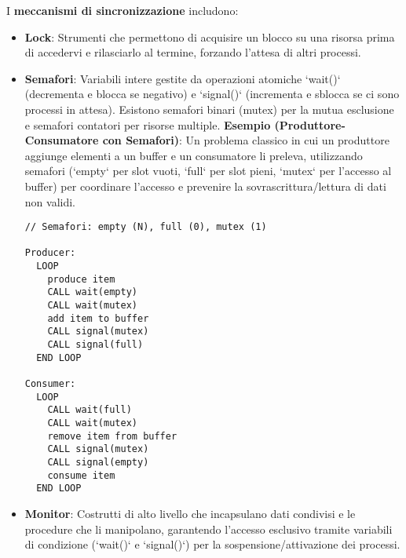 I \textbf{meccanismi di sincronizzazione} includono:
\begin{itemize}
    \item \textbf{Lock}: Strumenti che permettono di acquisire un blocco su una risorsa prima di accedervi e rilasciarlo al termine, forzando l'attesa di altri processi.
    \item \textbf{Semafori}: Variabili intere gestite da operazioni atomiche `wait()` (decrementa e blocca se negativo) e `signal()` (incrementa e sblocca se ci sono processi in attesa). Esistono semafori binari (mutex) per la mutua esclusione e semafori contatori per risorse multiple.
        \textbf{Esempio (Produttore-Consumatore con Semafori)}: Un problema classico in cui un produttore aggiunge elementi a un buffer e un consumatore li preleva, utilizzando semafori (`empty` per slot vuoti, `full` per slot pieni, `mutex` per l'accesso al buffer) per coordinare l'accesso e prevenire la sovrascrittura/lettura di dati non validi.
        \begin{lstlisting}[language=Pseudocode, numbers=none]
// Semafori: empty (N), full (0), mutex (1)

Producer:
  LOOP
    produce item
    CALL wait(empty)
    CALL wait(mutex)
    add item to buffer
    CALL signal(mutex)
    CALL signal(full)
  END LOOP

Consumer:
  LOOP
    CALL wait(full)
    CALL wait(mutex)
    remove item from buffer
    CALL signal(mutex)
    CALL signal(empty)
    consume item
  END LOOP
        \end{lstlisting}
    \item \textbf{Monitor}: Costrutti di alto livello che incapsulano dati condivisi e le procedure che li manipolano, garantendo l'accesso esclusivo tramite variabili di condizione (`wait()` e `signal()`) per la sospensione/attivazione dei processi.
\end{itemize}

